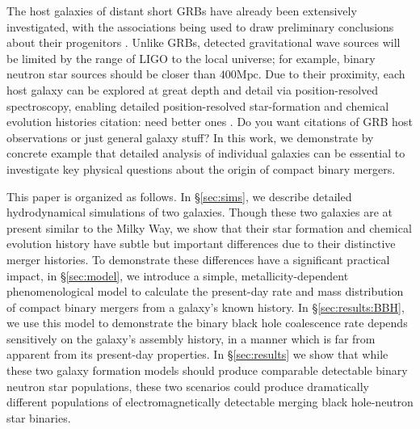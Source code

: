 \documentclass[nofootinbib,twocolumn,prd]{emulateapj}
\newcommand\editremark[1]{{\color{red}#1}}
\newcommand\jillianremark[1]{{\color{blue}#1}}
\newcommand\unit[1]{\text{#1}}
\begin{document}
The host galaxies of distant short GRBs have already been extensively investigated, with the associations being used to
draw preliminary conclusions about their progenitors  \cite{2014ARAA..52...43B}.   
Unlike GRBs, detected gravitational wave sources will be limited by the range of LIGO to the local universe; for
example,  binary neutron star sources should be closer than $400\unit{Mpc}$.  Due to their proximity, each host galaxy
can be explored at great depth and detail via  position-resolved spectroscopy, enabling detailed position-resolved star-formation
and chemical evolution histories \editremark{citation: need better ones} \citep[see,e.g.][]{2009MNRAS.396..462K,2014MNRAS.444..336C}. \jillianremark{Do you want citations of GRB host observations or just general galaxy stuff?}
In this work, we demonstrate by concrete example that detailed analysis of individual galaxies can be essential to
investigate key physical questions about the origin of compact binary mergers. 



This paper is organized as follows. 
In \S \ref{sec:sims}, we describe detailed hydrodynamical simulations of  two galaxies.  Though these two
galaxies are at  present similar to the Milky Way, we
show that their star formation and chemical evolution history have subtle but important differences due to their
distinctive merger histories.   To demonstrate
these differences have a significant practical impact,  in \S \ref{sec:model}, we introduce a simple,
metallicity-dependent  phenomenological model to calculate the present-day rate and mass distribution of compact binary
mergers from  a galaxy's known history.   In \S \ref{sec:results:BBH}, we use this model to demonstrate the binary black hole coalescence rate
depends sensitively on the galaxy's assembly history, in a manner which is far from apparent from its present-day
properties.  
In \S \ref{sec:results} we show that while these two galaxy formation models should produce comparable detectable binary neutron star
populations, these two scenarios could produce dramatically different populations of electromagnetically detectable
merging black hole-neutron star binaries. 
%


\end{document}
